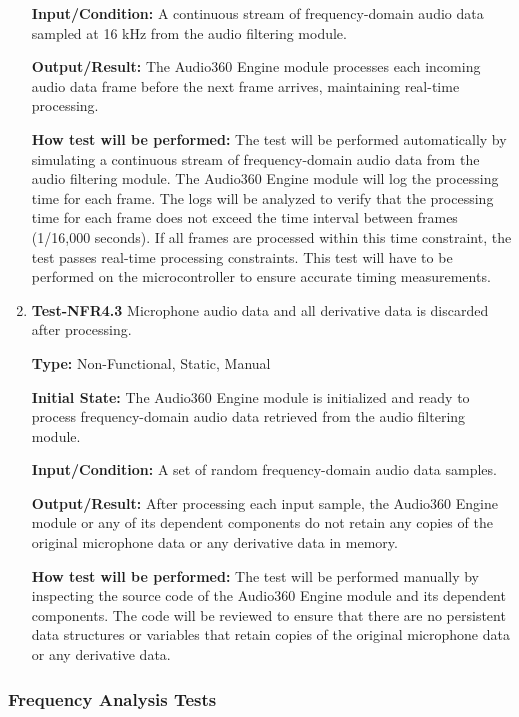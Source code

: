 \documentclass[12pt, titlepage]{article}
\begin{document}
\begin{enumerate}
\textbf{Input/Condition:}
A continuous stream of frequency-domain audio data sampled at 16 kHz from
the audio filtering module.

\textbf{Output/Result:}
The Audio360 Engine module processes each incoming audio data frame
before the next frame arrives, maintaining real-time processing.

\textbf{How test will be performed:}
The test will be performed automatically by simulating a continuous stream
of frequency-domain audio data from the audio filtering module. The
Audio360 Engine module will log the processing time for each frame. The
logs will be analyzed to verify that the processing time for each frame
does not exceed the time interval between frames (1/16,000 seconds). If
all frames are processed within this time constraint, the test passes real-time
processing constraints. This test will have to be performed on the 
microcontroller to ensure accurate timing measurements.

\item{\textbf{Test-NFR4.3} Microphone audio data and all derivative data is discarded
 after processing.\\}

\textbf{Type:} Non-Functional, Static, Manual

\textbf{Initial State:}
The Audio360 Engine module is initialized and ready to process frequency-domain
audio data retrieved from the audio filtering module.

\textbf{Input/Condition:}
A set of random frequency-domain audio data samples.

\textbf{Output/Result:}
After processing each input sample, the Audio360 Engine module or any of its
dependent components do not retain any copies of the original microphone data
or any derivative data in memory.

\textbf{How test will be performed:}
The test will be performed manually by inspecting the source code of the
Audio360 Engine module and its dependent components. The code will be reviewed
to ensure that there are no persistent data structures or variables that
retain copies of the original microphone data or any derivative data.

\end{enumerate}

\subsubsection{Frequency Analysis Tests}
\end{document}
